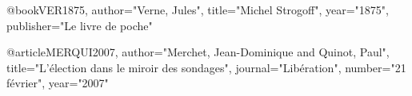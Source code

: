 
@book{VER1875,
   author="Verne, Jules",
   title="Michel {Strogoff}",
   year="1875",
   publisher="Le livre de poche"
}


@article{MERQUI2007,
   author="Merchet, Jean-Dominique and Quinot, Paul",
   title="L'{\'e}lection dans le miroir des sondages",
   journal="Lib{\'e}ration",
   number="21 f{\'e}vrier",
   year="2007"
}